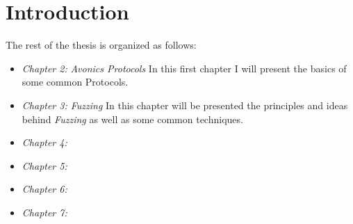 \documentclass[../main.tex]{subfiles}
\begin{document}
\chapter{Introduction}


The rest of the thesis is organized as follows:
\begin{itemize}
\item \textit{Chapter 2: }\textit{Avonics Protocols}\newline
In this first chapter I will present the basics of some common Protocols.

\item \textit{Chapter 3: \textit{Fuzzing}}\newline
In this chapter will be presented the principles and ideas behind \textit{Fuzzing} as well as some common techniques.

\item \textit{Chapter 4: }\newline

\item \textit{Chapter 5: }\newline

\item \textit{Chapter 6: }\newline

\item \textit{Chapter 7: }\newline
\end{itemize}
\end{document}
